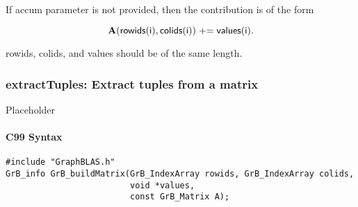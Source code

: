 If {\sf accum} parameter is not provided, then the contribution is of the form 

$${\bf A}({\sf rowids(i)}, {\sf colids(i)}) \mathrel{+}= {\sf values(i)}.$$
 
{\sf rowids}, {\sf colids}, and {\sf values} should be of the same length. 


\subsubsection{{\sf extractTuples}: Extract tuples from a matrix}

Placeholder


\paragraph{C99 Syntax}

\begin{verbatim}
#include "GraphBLAS.h"
GrB_info GrB_buildMatrix(GrB_IndexArray rowids, GrB_IndexArray colids,
                         void *values, 
                         const GrB_Matrix A);
\end{verbatim}
